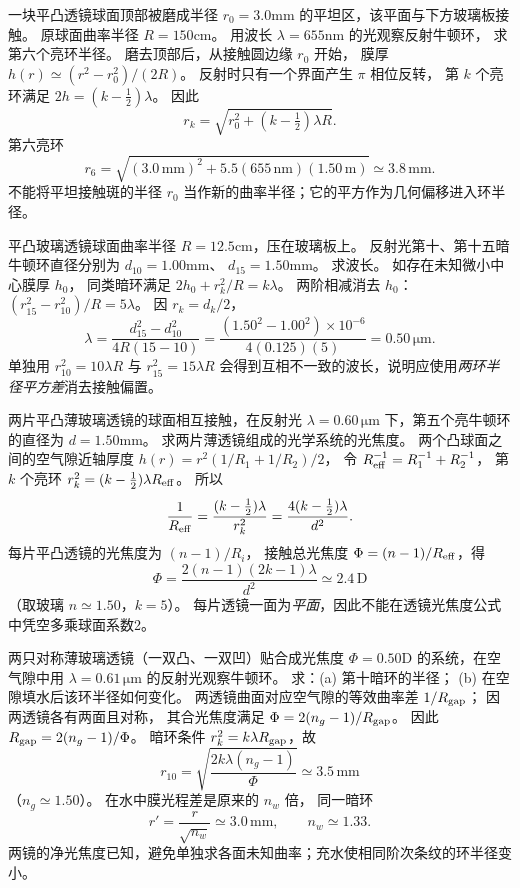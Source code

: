一块平凸透镜球面顶部被磨成半径
$r_0=3.0$mm 的平坦区，该平面与下方玻璃板接触。
原球面曲率半径
$R=150$cm。
用波长 $\lambda=655$nm 的光观察反射牛顿环，
求第六个亮环半径。
\exsolution
磨去顶部后，从接触圆边缘 $r_0$ 开始，
膜厚
$h(r)\simeq(r^2-r_0^2)/(2R)$。
反射时只有一个界面产生 $\pi$ 相位反转，
第 $k$ 个亮环满足
$2h=(k-\tfrac12)\lambda$。
因此
\[
\boxed{r_k=\sqrt{r_0^2+(k-\tfrac12)\lambda R}}.
\]
第六亮环
\[
\boxed{r_6=
\sqrt{(3.0\,\mathrm{mm})^2+
5.5(655\,\mathrm{nm})(1.50\,\mathrm m)}
\simeq3.8\,\mathrm{mm}}.
\]
\excheck 不能将平坦接触斑的半径 $r_0$ 当作新的曲率半径；它的平方作为几何偏移进入环半径。

平凸玻璃透镜球面曲率半径
$R=12.5$cm，压在玻璃板上。
反射光第十、第十五暗牛顿环直径分别为
$d_{10}=1.00$mm、
$d_{15}=1.50$mm。
求波长。
\exsolution
如存在未知微小中心膜厚 $h_0$，
同类暗环满足
$2h_0+r_k^2/R=k\lambda$。
两阶相减消去 $h_0$：
$(r_{15}^2-r_{10}^2)/R=5\lambda$。
因 $r_k=d_k/2$，
\[
\boxed{\lambda=
\frac{d_{15}^2-d_{10}^2}
{4R(15-10)}}
=\frac{(1.50^2-1.00^2)\times10^{-6}}
{4(0.125)(5)}
=\boxed{0.50\,\mathrm{\mu m}}.
\]
\excheck 单独用 $r_{10}^2=10\lambda R$ 与 $r_{15}^2=15\lambda R$ 会得到互相不一致的波长，说明应使用\emph{两环半径平方差}消去接触偏置。

两片平凸薄玻璃透镜的球面相互接触，在反射光
$\lambda=0.60\,\mathrm{\mu m}$ 下，第五个亮牛顿环的直径为
$d=1.50$mm。
求两片薄透镜组成的光学系统的光焦度。
\exsolution
两个凸球面之间的空气隙近轴厚度
$h(r)=r^2(1/R_1+1/R_2)/2$，
令
$R_{\rm eff}^{-1}=R_1^{-1}+R_2^{-1}$，
第 $k$ 个亮环
$r_k^2=(k-\tfrac12)\lambda R_{\rm eff}$。
所以
\[
\frac1{R_{\rm eff}}
=\frac{(k-\tfrac12)\lambda}{r_k^2}
=\frac{4(k-\tfrac12)\lambda}{d^2}.
\]
每片平凸透镜的光焦度为
$(n-1)/R_i$，
接触总光焦度
$\Phi=(n-1)/R_{\rm eff}$，得
\[
\boxed{\Phi=
\frac{2(n-1)(2k-1)\lambda}{d^2}
\simeq2.4\,\mathrm D}
\]
（取玻璃 $n\simeq1.50$，$k=5$）。
\excheck 每片透镜一面为\emph{平面}，因此不能在透镜光焦度公式中凭空多乘球面系数2。

两只对称薄玻璃透镜（一双凸、一双凹）贴合成光焦度
$\Phi=0.50$D 的系统，在空气隙中用
$\lambda=0.61\,\mathrm{\mu m}$ 的反射光观察牛顿环。
求：(a) 第十暗环的半径；
(b) 在空隙填水后该环半径如何变化。
\exsolution
两透镜曲面对应空气隙的等效曲率差
$1/R_{\rm gap}$；
因两透镜各有两面且对称，
其合光焦度满足
$\Phi=2(n_g-1)/R_{\rm gap}$。
因此
$R_{\rm gap}=2(n_g-1)/\Phi$。
暗环条件
$r_k^2=k\lambda R_{\rm gap}$，故
\[
\boxed{r_{10}=
\sqrt{\frac{2k\lambda(n_g-1)}{\Phi}}
\simeq3.5\,\mathrm{mm}}
\]
（$n_g\simeq1.50$）。
在水中膜光程差是原来的 $n_w$ 倍，
同一暗环
\[
\boxed{r'=\frac r{\sqrt{n_w}}
\simeq3.0\,\mathrm{mm}},\qquad n_w\simeq1.33.
\]
\excheck 两镜的净光焦度已知，避免单独求各面未知曲率；充水使相同阶次条纹的环半径变小。

